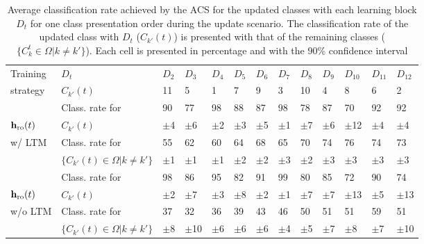 \begin{center}
\begin{table*}[tb]
  \small
  \centering
  \caption{Average classification rate achieved by the ACS for the updated classes with each learning block $D_t$ for one class presentation order during the update scenario. The classification rate of the updated class with $D_t$ ($C_{k'}(t)$) is presented with that of the remaining classes ($\{C_k^t\in \Omega|k\neq k'\}$). Each cell is presented in percentage and with the 90\% confidence interval}
  \footnotesize{
  \begin{tabular}{|l|l|lllllllllll|}
  \hline
	Training & $D_t$ & $D_{2}$ & $D_{3}$ & $D_{4}$ & $D_{5}$ & $D_{6}$ & $D_{7}$ & $D_{8}$ & $D_{9}$ & $D_{10}$ & $D_{11}$ & $D_{12}$	\\ \cline{2-13}
	strategy & $C_{k'}(t)$ & 11 & 5 & 1 & 7 & 9 & 3 & 10 & 4 & 8 & 6 & 2
	\\ \hline \hline

	 & Class. rate for & 90 & 77 & 98 & 88 & 87 & 98 & 78 & 87 & 70 & 92 & 92
	\\ 
	$\textbf{h}_\textnormal{ro}(t)$ & $C_{k'}(t)$ & $\pm$4 & $\pm$6 & $\pm$2 & $\pm$3 & $\pm$5 & $\pm$1	& $\pm$7 & $\pm$6 & $\pm$12 & $\pm$4 & $\pm$4
	\\ \cline{2-13} 
	w/ LTM & Class. rate for & 55 & 62 & 60 & 64 & 68 & 65 & 70 & 74 & 76 & 74 & 73
	\\ 
	 & $\{C_{k'}(t)\in\Omega|k\neq k'\}$ & $\pm$1 & $\pm$1 & $\pm$1 & $\pm$2
	& $\pm$2 & $\pm$3 & $\pm$2 & $\pm$3 & $\pm$3 & $\pm$3 & $\pm$3
	\\ \hline \hline
	 & Class. rate for & 98 & 86 & 95 & 82 & 91 & 99 & 80 & 85 & 72 & 90 & 74 \\ 
	 $\textbf{h}_\textnormal{ro}(t)$ & $C_{k'}(t)$ & $\pm$2 & $\pm$7 & $\pm$3 & $\pm$8 & $\pm$2 & $\pm$1 & $\pm$7 & $\pm$7 & $\pm$13 & $\pm$5 & $\pm$13	\\ \cline{2-13} 
	w/o LTM & Class. rate for & 37 & 32 & 36 & 39 & 43 & 46 & 50 & 51 & 51 & 59 & 51 \\ 
	& $\{C_{k'}(t)\in\Omega|k\neq k'\}$ & $\pm$8 & $\pm$10 & $\pm$6 & $\pm$6
	& $\pm$6 & $\pm$4 & $\pm$5 & $\pm$7 & $\pm$8 & $\pm$7 & $\pm$10
	\\ \hline

	\end{tabular} }
	\label{tab:c1_RefEvo}
\end{table*}
\end{center}

